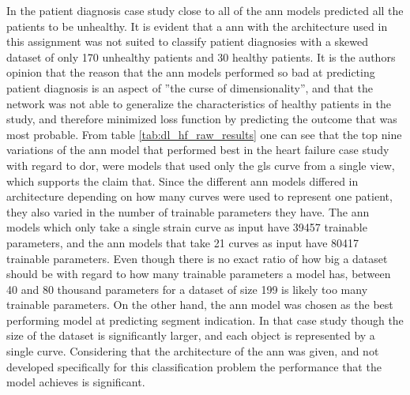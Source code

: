 In the patient diagnosis case study close to all of the \acrshort{ann} models predicted all the patients to be unhealthy. It is evident that a \acrshort{ann} with the architecture used in this assignment was not suited to classify patient diagnosies with a skewed dataset of only 170 unhealthy patients and 30 healthy patients. It is the authors opinion that the reason that the \acrshort{ann} models performed so bad at predicting patient diagnosis is an aspect of ''the curse of dimensionality'', and that the network was not able to generalize the characteristics of healthy patients in the study, and therefore minimized loss function by predicting the outcome that was most probable. From table \ref{tab:dl_hf_raw_results} one can see that the top nine variations of the \acrshort{ann} model that performed best in the heart failure case study with regard to \acrshort{dor}, were models that used only the \acrshort{gls} curve from a single view, which supports the claim that. Since the different \acrshort{ann} models differed in architecture depending on how many curves were used to represent one patient, they also varied in the number of trainable parameters they have. The \acrshort{ann} models which only take a single strain curve as input have 39457 trainable parameters, and the \acrshort{ann} models that take 21 curves as input have 80417 trainable parameters. Even though there is no exact ratio of how big a dataset should be with regard to how many trainable parameters a model has, between 40 and 80 thousand parameters for a dataset of size 199 is likely too many trainable parameters. On the other hand, the \acrshort{ann} model was chosen as the best performing model at predicting segment indication. In that case study though the size of the dataset is significantly larger, and each object is represented by a single curve. Considering that the architecture of the \acrshort{ann} was given, and not developed specifically for this classification problem the performance that the model achieves is significant. \bigskip
